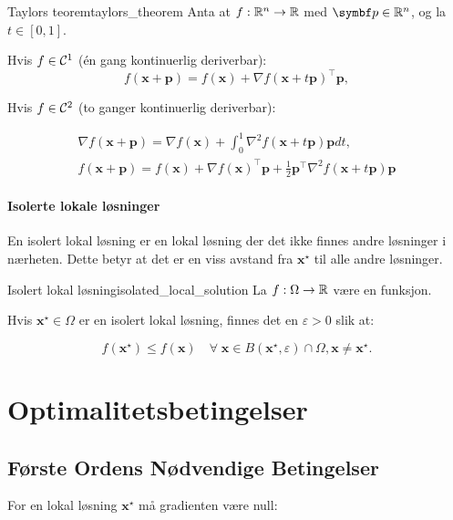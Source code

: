 \begin{theorem}{Taylors teorem}{taylors_theorem}
	Anta at \(f: \mathbb{R}^n \to \mathbb{R}\) med \(\mathbf{p}\in\R^n\), og la \(t\in[0,1]\).

	\medskip

	Hvis \(f\in\mathcal{C}^1\) (én gang kontinuerlig deriverbar):
	\[
		f(\mathbf{x} + \mathbf{p}) = f(\mathbf{x}) + \nabla f(\mathbf{x}+t\mathbf{p})^\top \mathbf{p},
	\]

	Hvis \(f \in \mathcal{C}^2\) (to ganger kontinuerlig deriverbar):

	\begin{align*}
		\nabla f(\mathbf{x} + \mathbf{p}) = \nabla f(\mathbf{x}) + \int_0^1 \nabla^2 f(\mathbf{x}+t\mathbf{p})\mathbf{p} dt, \\
		\boxed{f(\mathbf{x} + \mathbf{p}) = f(\mathbf{x}) + \nabla f(\mathbf{x})^\top \mathbf{p} + \frac{1}{2}\mathbf{p}^\top \nabla^2 f(\mathbf{x}+t\mathbf{p})\mathbf{p}}
	\end{align*}
\end{theorem}

\subsubsection{Isolerte lokale løsninger}
En isolert lokal løsning er en lokal løsning der det ikke finnes andre løsninger i nærheten. Dette betyr at det er en viss avstand fra \(\symbf{x}^\star\) til alle andre løsninger.

\begin{lemma}{Isolert lokal løsning}{isolated_local_solution}
	La \(f: \Omega \to \mathbb{R}\) være en funksjon.

	Hvis \(\symbf{x}^\star \in \Omega\) er en isolert lokal løsning, finnes det en \(\varepsilon > 0\) slik at:

	\[
		f(\symbf{x}^\star) \leq f(\symbf{x}) \quad \forall \; \symbf{x} \in B(\symbf{x}^\star, \varepsilon) \cap \Omega, \symbf{x} \neq \symbf{x}^\star.
	\]
\end{lemma}

\chapter{Optimalitetsbetingelser}
\label{chap:optimality_conditions}
\section{Første Ordens Nødvendige Betingelser}

For en lokal løsning \(\mathbf{x}^\star\) må gradienten være null:

